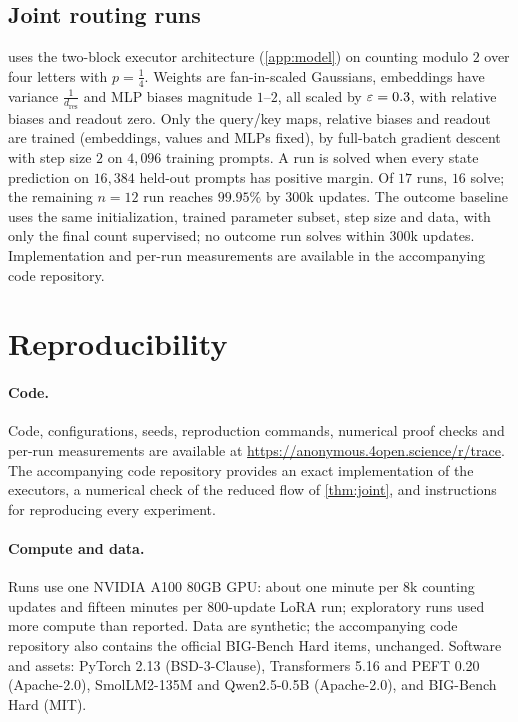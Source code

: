 \subsection{Joint routing runs}
\label{app:reach}

 uses the two-block executor architecture (\cref{app:model}) on counting modulo $2$ over four letters with $p=\tfrac{1}{4}$.
Weights are fan-in-scaled Gaussians, embeddings have variance $\frac{1}{d_{\mathrm{res}}}$ and MLP biases magnitude $1$--$2$, all scaled by
$\varepsilon=0.3$, with relative biases and readout zero. Only the query/key maps, relative biases and readout are trained (embeddings,
values and MLPs fixed), by full-batch gradient descent with step size $2$ on $4{,}096$ training prompts. A run is solved when every state
prediction on $16{,}384$ held-out prompts has positive margin.
Of $17$ runs, $16$ solve; the remaining $n=12$ run reaches $99.95\%$ by $300$k updates. The outcome baseline uses the same
initialization, trained parameter subset, step size and data, with only the final count supervised; no outcome run
solves within $300$k updates. Implementation and per-run measurements are available in the accompanying code repository.

\section{Reproducibility}
\label{app:reproducibility}

\paragraph{Code.} Code, configurations, seeds, reproduction commands, numerical proof checks and per-run measurements are available at
\url{https://anonymous.4open.science/r/trace}. The accompanying code repository provides an exact implementation of the executors,
a numerical check of the reduced flow of \cref{thm:joint}, and instructions for reproducing every experiment.

\paragraph{Compute and data.} Runs use one NVIDIA A100 80GB GPU: about one minute per $8$k counting updates and fifteen minutes per
$800$-update LoRA run; exploratory runs used more compute than reported. Data are synthetic; the accompanying code repository also
contains the official BIG-Bench Hard items, unchanged. Software and assets: PyTorch 2.13 (BSD-3-Clause), Transformers 5.16 and PEFT 0.20 (Apache-2.0), SmolLM2-135M
\citep{allal2025smollm2} and Qwen2.5-0.5B \citep{qwen2025qwen25} (Apache-2.0), and BIG-Bench Hard \citep{suzgun2022challenging} (MIT).
